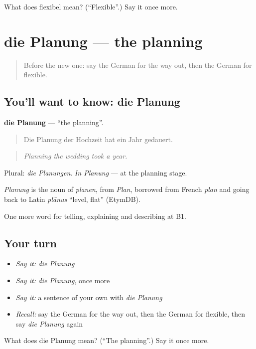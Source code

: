 \begin{tcolorbox}[breakable,colback=teal!4,colframe=teal!35!black,title={Before you move on}]
What does flexibel mean? (\textquotedblleft{}Flexible\textquotedblright{}.) Say it once more.
\end{tcolorbox}
\section[die Planung]{die Planung — the planning}

\label{lesson:GE-C374-planung}



\begin{quote}
Before the new one: say the German for the way out, then the German for flexible.
\end{quote}

\subsection*{You'll want to know: die Planung}
\textbf{die Planung} — \textquotedblleft{}the planning\textquotedblright{}.

\begin{quote}
Die Planung der Hochzeit hat ein Jahr gedauert.
\end{quote}

\begin{quote}
\emph{Planning the wedding took a year.}
\end{quote}

Plural: \emph{die Planungen}. \emph{In Planung} — at the planning stage.

\begin{cousinweb}
\emph{Planung} is the noun of \emph{planen}, from \emph{Plan}, borrowed from French \emph{plan} and going back to Latin \emph{plānus} \textquotedblleft{}level, flat\textquotedblright{} (EtymDB).
\end{cousinweb}

\begin{grammarlens}[title={What you've built}]
One more word for telling, explaining and describing at B1.
\end{grammarlens}

\subsection*{Your turn}
\begin{itemize}
\raggedright
  \item \emph{Say it:} \emph{die Planung}
  \item \emph{Say it:} \emph{die Planung}, once more
  \item \emph{Say it:} a sentence of your own with \emph{die Planung}
  \item \emph{Recall:} say the German for the way out, then the German for flexible, then say \emph{die Planung} again
\end{itemize}

\begin{tcolorbox}[breakable,colback=teal!4,colframe=teal!35!black,title={Before you move on}]
What does die Planung mean? (\textquotedblleft{}The planning\textquotedblright{}.) Say it once more.
\end{tcolorbox}
